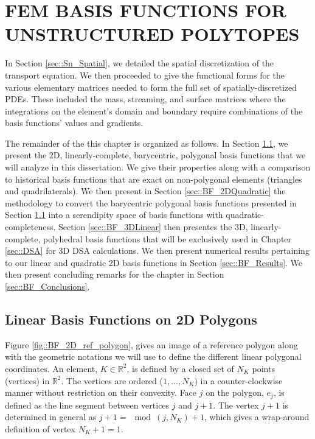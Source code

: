%
%
%
\chapter{\uppercase {FEM Basis Functions for Unstructured Polytopes}}
\label{sec::BF}

In Section \ref{sec::Sn_Spatial}, we detailed the spatial discretization of the transport equation. We then proceeded to give the functional forms for the various elementary matrices needed to form the full set of spatially-discretized PDEs. These included the mass, streaming, and surface matrices where the integrations on the element's domain and boundary require combinations of the basis functions' values and gradients.

The remainder of the this chapter is organized as follows. In Section \ref{sec::BF_2DLinear}, we present the 2D, linearly-complete, barycentric, polygonal basis functions that we will analyze in this dissertation. We give their properties along with a comparison to historical basis functions that are exact on non-polygonal elements (triangles and quadrilaterals). We then present in Section \ref{sec::BF_2DQuadratic} the methodology to convert the barycentric polygonal basis functions presented in Section \ref{sec::BF_2DLinear} into a serendipity space of basis functions with quadratic-completeness. Section \ref{sec::BF_3DLinear} then presentes the 3D, linearly-complete, polyhedral basis functions that will be exclusively used in Chapter \ref{sec::DSA} for 3D DSA calculations. We then present numerical results pertaining to our linear and quadratic 2D basis functions in Section \ref{sec::BF_Results}. We then present concluding remarks for the chapter in Section \ref{sec::BF_Conclusions}.

\section{Linear Basis Functions on 2D Polygons}
\label{sec::BF_2DLinear}

Figure \ref{fig::BF_2D_ref_polygon}, gives an image of a reference polygon along with the geometric notations we will use to define the different linear polygonal coordinates. An element, $K\in \mathbb{R}^2$, is defined by a closed set of $N_K$ points (vertices) in $\mathbb{R}^2$. The vertices are ordered ($1,...,N_K$) in a counter-clockwise manner without restriction on their convexity. Face $j$ on the polygon, $e_j$, is defined as the line segment between vertices $j$ and $j+1$. The vertex $j+1$ is determined in general as $j+1 =\mod(j,N_K)+1$, which gives a wrap-around definition of vertex $N_K+1 = 1$.

